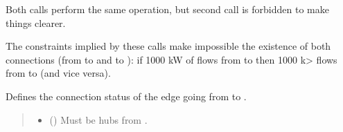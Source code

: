 \documentclass[letterpaper,10pt,english]{sphinxmanual}
\begin{document}
\begin{fulllineitems}
\begin{fulllineitems}
\sphinxAtStartPar
Both calls perform the same operation, but second call is forbidden to make things clearer.

\begin{sphinxVerbatim}[commandchars=\\\{\}]
  
  
\end{sphinxVerbatim}

\sphinxAtStartPar
The constraints implied by these calls make impossible the existence of both connections
(from  to  and  to ): if 1000 kW of  flows from  to 
then \sphinxhyphen{}1000 k\textgreater{} flows from  to  (and vice versa).

\end{fulllineitems}


\begin{fulllineitems}
\label{\detokenize{generated/tamos.network.HREThermalNetwork:tamos.network.HREThermalNetwork.set_connection_status}}
\pysigstartsignatures
{}
\pysigstopsignatures
\sphinxAtStartPar
Defines the connection status of the edge going from  to .
\begin{quote}\begin{description}
\begin{itemize}
\item {} 
\sphinxAtStartPar
{} ({\hyperref[\detokenize{generated/tamos.Hub:tamos.Hub}]{}}) \textendash{} Must be hubs from .


\end{itemize}
\end{description}
\end{quote}
\end{fulllineitems}
\end{fulllineitems}
\end{document}
